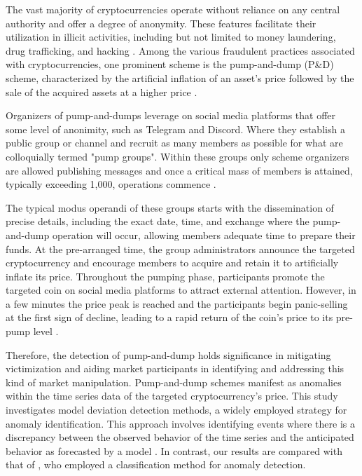 \documentclass[12pt]{article}
\begin{document}
	The vast majority of cryptocurrencies operate without reliance on any central authority and offer a degree of anonymity.
	These features facilitate their utilization in illicit activities, including but not limited to money laundering, drug trafficking, and hacking \citep{Kethineni2019}.
	Among the various fraudulent practices associated with cryptocurrencies, one prominent scheme is the pump-and-dump (P\&D) scheme, characterized by the artificial inflation of an asset's price followed by the sale of the acquired assets at a higher price \citep{li2021}.

	Organizers of pump-and-dumps leverage on social media platforms that offer some level of anonimity, such as Telegram and Discord.
	Where they establish a public group or channel and recruit as many members as possible for what are colloquially termed "pump groups".
	Within these groups only scheme organizers are allowed publishing messages and once a critical mass of members is attained, typically exceeding 1,000, operations commence \citep{xu2019}.

	The typical modus operandi of these groups starts with the dissemination of precise details, including the exact date, time, and exchange where the pump-and-dump operation will occur, allowing members adequate time to prepare their funds.
	At the pre-arranged time, the group administrators announce the targeted cryptocurrency and encourage members to acquire and retain it to artificially inflate its price.
	Throughout the pumping phase, participants promote the targeted coin on social media platforms to attract external attention.
	However, in a few minutes the price peak is reached and the participants begin panic-selling at the first sign of decline, leading to a rapid return of the coin's price to its pre-pump level \citep{xu2019}.

	Therefore, the detection of pump-and-dump holds significance in mitigating victimization and aiding market participants in identifying and addressing this kind of market manipulation.
	Pump-and-dump schemes manifest as anomalies within the time series data of the targeted cryptocurrency's price.
	This study investigates model deviation detection methods, a widely employed strategy for anomaly identification.
	This approach involves identifying events where there is a discrepancy between the observed behavior of the time series and the anticipated behavior as forecasted by a model \citep{ogasawara2024}.
	In contrast, our results are compared with that of \citet{lamorgia2020}, who employed a classification method for anomaly detection.
\end{document}
